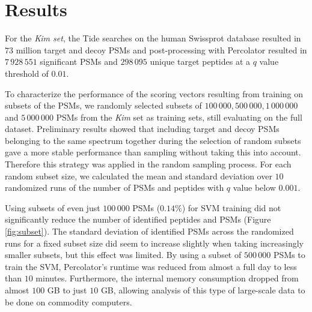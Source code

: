 \documentclass{article}
\begin{document}
\section*{Results}

For the {\em Kim set}, the Tide searches on the human Swissprot
database resulted in $73$ million target and decoy PSMs and
post-processing with Percolator resulted in $7\,928\,551$ significant
PSMs and $298\,095$ unique target peptides at a $q$ value threshold of
$0.01$.

To characterize the performance of the scoring vectors resulting from
training on subsets of the PSMs, we randomly selected subsets of
$100\,000, 500\,000, 1\,000\,000$ and $5\,000\,000$ PSMs from the {\em
  Kim} set as training sets, still evaluating on the full
dataset. Preliminary results showed that including target and decoy
PSMs belonging to the same spectrum together during the selection of
random subsets gave a more stable performance than sampling without
taking this into account. Therefore this strategy was applied in the
random sampling process. For each random subset size, we calculated
the mean and standard deviation over $10$ randomized runs of the
number of PSMs and peptides with $q$ value below $0.001$.

Using subsets of even just $100\,000$ PSMs ($0.14\%$) for SVM training
did not significantly reduce the number of identified peptides and
PSMs (Figure \ref{fig:subset}). The standard deviation of identified
PSMs across the randomized runs for a fixed subset size did seem to
increase slightly when taking increasingly smaller subsets, but this
effect was limited. By using a subset of $500\,000$ PSMs to train the
SVM, Percolator's runtime was reduced from almost a full day to less
than $10$ minutes. Furthermore, the internal memory consumption
dropped from almost $100$ GB to just $10$ GB, allowing analysis of
this type of large-scale data to be done on commodity computers.
\end{document}
